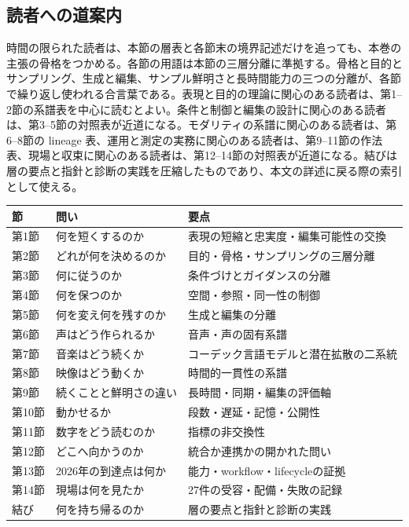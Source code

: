 \documentclass[lualatex,a4paper,10pt]{jlreq}
\begin{document}
\subsection*{読者への道案内}
時間の限られた読者は、本節の層表と各節末の境界記述だけを追っても、本巻の主張の骨格をつかめる。各節の用語は本節の三層分離に準拠する。骨格と目的とサンプリング、生成と編集、サンプル鮮明さと長時間能力の三つの分離が、各節で繰り返し使われる合言葉である。表現と目的の理論に関心のある読者は、第1--2節の系譜表を中心に読むとよい。条件と制御と編集の設計に関心のある読者は、第3--5節の対照表が近道になる。モダリティの系譜に関心のある読者は、第6--8節の lineage 表、運用と測定の実務に関心のある読者は、第9--11節の作法表、現場と収束に関心のある読者は、第12--14節の対照表が近道になる。結びは層の要点と指針と診断の実践を圧縮したものであり、本文の詳述に戻る際の索引として使える。

\begin{center}
\small
\begin{tabularx}{\textwidth}{@{}p{}p{}X@{}}
\toprule
節 & 問い & 要点 \\
\midrule
第1節 & 何を短くするのか & 表現の短縮と忠実度・編集可能性の交換 \\
第2節 & どれが何を決めるのか & 目的・骨格・サンプリングの三層分離 \\
第3節 & 何に従うのか & 条件づけとガイダンスの分離 \\
第4節 & 何を保つのか & 空間・参照・同一性の制御 \\
第5節 & 何を変え何を残すのか & 生成と編集の分離 \\
第6節 & 声はどう作られるか & 音声・声の固有系譜 \\
第7節 & 音楽はどう続くか & コーデック言語モデルと潜在拡散の二系統 \\
第8節 & 映像はどう動くか & 時間的一貫性の系譜 \\
第9節 & 続くことと鮮明さの違い & 長時間・同期・編集の評価軸 \\
第10節 & 動かせるか & 段数・遅延・記憶・公開性 \\
第11節 & 数字をどう読むのか & 指標の非交換性 \\
第12節 & どこへ向かうのか & 統合か連携かの開かれた問い \\
第13節 & 2026年の到達点は何か & 能力・workflow・lifecycleの証拠 \\
第14節 & 現場は何を見たか & 27件の受容・配備・失敗の記録 \\
結び & 何を持ち帰るのか & 層の要点と指針と診断の実践 \\
\bottomrule
\end{tabularx}
\end{center}
\end{document}
